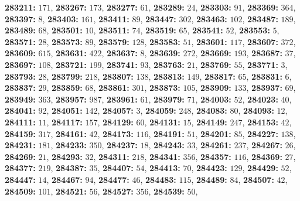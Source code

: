 \textsf{\bfseries 283211:} $171$, \textsf{\bfseries 283267:} $173$, \textsf{\bfseries 283277:} $61$, \textsf{\bfseries 283289:} $24$, \textsf{\bfseries 283303:} $91$, \textsf{\bfseries 283369:} $364$, \textsf{\bfseries 283397:} $8$, \textsf{\bfseries 283403:} $161$, \textsf{\bfseries 283411:} $89$, \textsf{\bfseries 283447:} $302$, \textsf{\bfseries 283463:} $102$, \textsf{\bfseries 283487:} $189$, \textsf{\bfseries 283489:} $68$, \textsf{\bfseries 283501:} $10$, \textsf{\bfseries 283511:} $74$, \textsf{\bfseries 283519:} $65$, \textsf{\bfseries 283541:} $52$, \textsf{\bfseries 283553:} $5$, \textsf{\bfseries 283571:} $28$, \textsf{\bfseries 283573:} $89$, \textsf{\bfseries 283579:} $128$, \textsf{\bfseries 283583:} $51$, \textsf{\bfseries 283601:} $117$, \textsf{\bfseries 283607:} $372$, \textsf{\bfseries 283609:} $615$, \textsf{\bfseries 283631:} $422$, \textsf{\bfseries 283637:} $8$, \textsf{\bfseries 283639:} $272$, \textsf{\bfseries 283669:} $193$, \textsf{\bfseries 283687:} $37$, \textsf{\bfseries 283697:} $108$, \textsf{\bfseries 283721:} $199$, \textsf{\bfseries 283741:} $93$, \textsf{\bfseries 283763:} $21$, \textsf{\bfseries 283769:} $55$, \textsf{\bfseries 283771:} $3$, \textsf{\bfseries 283793:} $28$, \textsf{\bfseries 283799:} $218$, \textsf{\bfseries 283807:} $138$, \textsf{\bfseries 283813:} $149$, \textsf{\bfseries 283817:} $65$, \textsf{\bfseries 283831:} $6$, \textsf{\bfseries 283837:} $29$, \textsf{\bfseries 283859:} $68$, \textsf{\bfseries 283861:} $301$, \textsf{\bfseries 283873:} $105$, \textsf{\bfseries 283909:} $133$, \textsf{\bfseries 283937:} $69$, \textsf{\bfseries 283949:} $363$, \textsf{\bfseries 283957:} $987$, \textsf{\bfseries 283961:} $61$, \textsf{\bfseries 283979:} $71$, \textsf{\bfseries 284003:} $52$, \textsf{\bfseries 284023:} $40$, \textsf{\bfseries 284041:} $92$, \textsf{\bfseries 284051:} $142$, \textsf{\bfseries 284057:} $3$, \textsf{\bfseries 284059:} $248$, \textsf{\bfseries 284083:} $80$, \textsf{\bfseries 284093:} $12$, \textsf{\bfseries 284111:} $11$, \textsf{\bfseries 284117:} $157$, \textsf{\bfseries 284129:} $60$, \textsf{\bfseries 284131:} $15$, \textsf{\bfseries 284149:} $247$, \textsf{\bfseries 284153:} $42$, \textsf{\bfseries 284159:} $317$, \textsf{\bfseries 284161:} $42$, \textsf{\bfseries 284173:} $116$, \textsf{\bfseries 284191:} $51$, \textsf{\bfseries 284201:} $85$, \textsf{\bfseries 284227:} $138$, \textsf{\bfseries 284231:} $181$, \textsf{\bfseries 284233:} $350$, \textsf{\bfseries 284237:} $18$, \textsf{\bfseries 284243:} $33$, \textsf{\bfseries 284261:} $237$, \textsf{\bfseries 284267:} $26$, \textsf{\bfseries 284269:} $21$, \textsf{\bfseries 284293:} $32$, \textsf{\bfseries 284311:} $218$, \textsf{\bfseries 284341:} $356$, \textsf{\bfseries 284357:} $116$, \textsf{\bfseries 284369:} $27$, \textsf{\bfseries 284377:} $219$, \textsf{\bfseries 284387:} $35$, \textsf{\bfseries 284407:} $54$, \textsf{\bfseries 284413:} $70$, \textsf{\bfseries 284423:} $129$, \textsf{\bfseries 284429:} $52$, \textsf{\bfseries 284447:} $14$, \textsf{\bfseries 284467:} $94$, \textsf{\bfseries 284477:} $46$, \textsf{\bfseries 284483:} $115$, \textsf{\bfseries 284489:} $84$, \textsf{\bfseries 284507:} $42$, \textsf{\bfseries 284509:} $101$, \textsf{\bfseries 284521:} $56$, \textsf{\bfseries 284527:} $356$, \textsf{\bfseries 284539:} $50$, 
